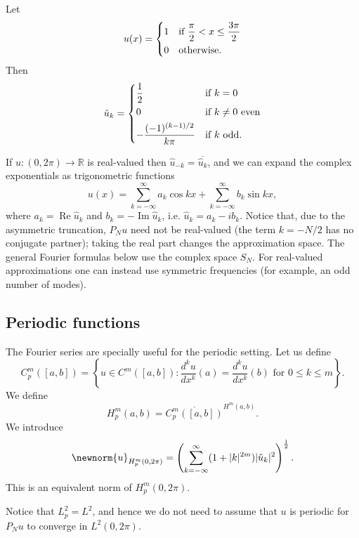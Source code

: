 \begin{example}
    Let
    \begin{equation*}
        u(x) = \begin{dcases}
            1 & \text{if } \frac \pi 2 < x \le \frac {3\pi}{2} \\
            0 & \text{otherwise}.
        \end{dcases}
    \end{equation*}
    Then
    \begin{equation*}
        \hat u_k = \begin{dcases}
            \frac 1 2                     & \text{if } k = 0                \\
            0                             & \text{if } k \ne 0 \text{ even} \\
            -\frac{(-1)^{(k-1)/2}}{k \pi} & \text{if } k \text{ odd.}
        \end{dcases}
    \end{equation*}
\end{example}
If $u: (0,2\pi)\to \mathbb R$ is real-valued then $\hat u_{-k} = \overline{\hat u_k}$, and we can expand the complex exponentials as trigonometric functions
\begin{equation*}
    u(x) = \sum_{k=-\infty}^{\infty} a_k \cos k x + \sum_{k=-\infty}^\infty b_k \sin k x,
\end{equation*}
where $a_k = \operatorname{Re} \hat u_k$ and $b_k = -\operatorname{Im} \hat u_k$, i.e. $\hat u_k = a_k - i b_k$. Notice that, due to the asymmetric truncation, $P_N u$ need not be real-valued (the term $k = -N/2$ has no conjugate partner); taking the real part changes the approximation space. The general Fourier formulas below use the complex space $S_N$. For real-valued approximations one can instead use symmetric frequencies (for example, an odd number of modes).

\subsection{Periodic functions}

The Fourier series are specially useful for the periodic setting. Let us define
\begin{equation*}
    C^m_p([a,b]) = \left\{ u\in C^m ([a,b]) : \frac{d^k u}{dx^k}(a) = \frac{d^k u}{dx^k}(b) \text{ for } 0 \le k \le m \right\}.
\end{equation*}
We define
\begin{equation*}
    H^m_p(a,b) = \overline{C^m_p([a,b])}^{H^m(a,b)}.
\end{equation*}
We introduce
\begin{equation*}
    \newnorm{u}_{H_p^m(0,2\pi)} = \left(\sum_{k=-\infty}^{\infty} (1 + |k|^{2m}) |\hat u_k|^2 \right)^{\frac 1 2}.
\end{equation*}
This is an equivalent norm of $H_p^m(0,2\pi)$.
\begin{remark}
    Notice that $L^2_p = L^2$, and hence we do not need to assume that $u$ is periodic for $P_N u$ to converge in $L^2(0,2\pi)$.
\end{remark}



